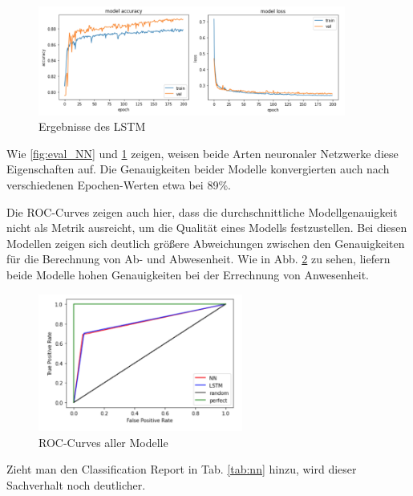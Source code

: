 \begin{figure}[h]
    \centering
    \includegraphics[width=0.9\textwidth]{pic/eval_LSTM.png}
    \caption{Ergebnisse des LSTM}
    \label{fig:eval_LSTM}
\end{figure}

Wie \ref{fig:eval_NN} und \ref{fig:eval_LSTM} zeigen, weisen beide Arten neuronaler Netzwerke diese Eigenschaften auf. Die Genauigkeiten beider Modelle
konvergierten auch nach verschiedenen Epochen-Werten etwa bei 89\%.

\newpage
Die ROC-Curves zeigen auch hier, dass die durchschnittliche Modellgenauigkeit nicht als Metrik ausreicht, um
die Qualität eines Modells festzustellen. Bei diesen Modellen zeigen sich deutlich größere Abweichungen zwischen
den Genauigkeiten für die Berechnung von Ab- und Abwesenheit. Wie in Abb. \ref{fig:Roc_nn} zu sehen, liefern
beide Modelle hohen Genauigkeiten bei der Errechnung von Anwesenheit.

\begin{figure}[!h]
    \centering
    \includegraphics[width=0.6\textwidth]{pic/roc_nn.png}
    \caption{ROC-Curves aller Modelle}
    \label{fig:Roc_nn}
\end{figure}

Zieht man den Classification Report in Tab. \ref{tab:nn} hinzu, wird dieser Sachverhalt noch deutlicher.


